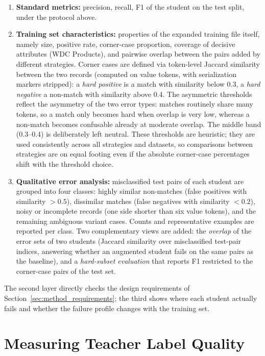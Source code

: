 \documentclass[a4paper,oneside,bibliography=totoc]{scrbook}
\begin{document}
\begin{enumerate}
\item \textbf{Standard metrics:} precision, recall, F1 of the student on the test split, under the protocol above.
\item \textbf{Training set characteristics:} properties of the expanded training file itself, namely size, positive rate, corner-case proportion, coverage of decisive attributes (WDC Products), and pairwise overlap between the pairs added by different strategies. Corner cases are defined via token-level Jaccard similarity between the two records (computed on value tokens, with serialization markers stripped): a \emph{hard positive} is a match with similarity below 0.3, a \emph{hard negative} a non-match with similarity above 0.4. The asymmetric thresholds reflect the asymmetry of the two error types: matches routinely share many tokens, so a match only becomes hard when overlap is very low, whereas a non-match becomes confusable already at moderate overlap. The middle band (0.3--0.4) is deliberately left neutral. These thresholds are heuristic; they are used consistently across all strategies and datasets, so comparisons between strategies are on equal footing even if the absolute corner-case percentages shift with the threshold choice.
\item \textbf{Qualitative error analysis:} misclassified test pairs of each student are grouped into four classes: highly similar non-matches (false positives with similarity $> 0.5$), dissimilar matches (false negatives with similarity $< 0.2$), noisy or incomplete records (one side shorter than six value tokens), and the remaining ambiguous variant cases. Counts and representative examples are reported per class. Two complementary views are added: the \emph{overlap} of the error sets of two students (Jaccard similarity over misclassified test-pair indices, answering whether an augmented student fails on the same pairs as the baseline), and a \emph{hard-subset evaluation} that reports F1 restricted to the corner-case pairs of the test set.
\end{enumerate}

The second layer directly checks the design requirements of Section~\ref{sec:method_requirements}; the third shows where each student actually fails and whether the failure profile changes with the training set.

\section{Measuring Teacher Label Quality}
\label{sec:setup_teacher}
\end{document}
